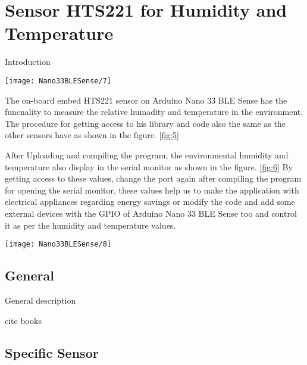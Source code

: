%
%

\chapter{Sensor HTS221 for Humidity and Temperature}

Introduction



\begin{center}
    \texttt{[image: Nano33BLESense/7]}
    \label{fig:5}
\end{center}

The on-board embed HTS221 sensor on Arduino Nano 33 BLE Sense has the funcnality to measure the relative humadity and temperature in the environment. The procedure for getting access to his library and code also the same as the other sensors have as shown in the figure.  \ref{fig:5}

After Uploading and compiling the program, the environmental humidity and temperature also display in the serial monitor as shown in the figure.  \ref{fig:6} By getting access to these values, change the port again after compiling the program for opening the serial monitor, these values help us to make the application with electrical appliances regarding energy savings or modify the code and add some external devices with the GPIO of Arduino Nano 33 BLE Sense too and control it as per the humidity and temperature values.

\begin{center}
    \texttt{[image: Nano33BLESense/8]}
    \label{fig:6}
\end{center}


\section{General}

General description

cite books

\section{Specific Sensor}

